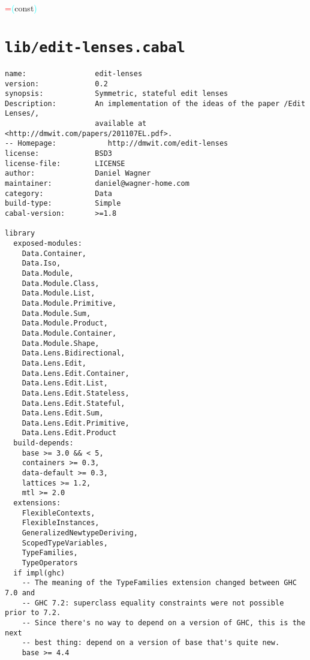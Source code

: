 \hsspace \hsspace \hsspace \hsspace \hsspace \hsspace \hsspace \hsspace \hsspace \hsspace \hsspace \textcolor{red}{=}\hsspace \textcolor{cyan}{(}{\rm{}const}\textcolor{cyan}{)}\\
\section{\texttt{lib/edit-lenses.cabal}}
\begin{verbatim}
name:                edit-lenses
version:             0.2
synopsis:            Symmetric, stateful edit lenses
Description:         An implementation of the ideas of the paper /Edit Lenses/,
                     available at <http://dmwit.com/papers/201107EL.pdf>.
-- Homepage:            http://dmwit.com/edit-lenses
license:             BSD3
license-file:        LICENSE
author:              Daniel Wagner
maintainer:          daniel@wagner-home.com
category:            Data
build-type:          Simple
cabal-version:       >=1.8

library
  exposed-modules:
    Data.Container,
    Data.Iso,
    Data.Module,
    Data.Module.Class,
    Data.Module.List,
    Data.Module.Primitive,
    Data.Module.Sum,
    Data.Module.Product,
    Data.Module.Container,
    Data.Module.Shape,
    Data.Lens.Bidirectional,
    Data.Lens.Edit,
    Data.Lens.Edit.Container,
    Data.Lens.Edit.List,
    Data.Lens.Edit.Stateless,
    Data.Lens.Edit.Stateful,
    Data.Lens.Edit.Sum,
    Data.Lens.Edit.Primitive,
    Data.Lens.Edit.Product
  build-depends:
    base >= 3.0 && < 5,
    containers >= 0.3,
    data-default >= 0.3,
    lattices >= 1.2,
    mtl >= 2.0
  extensions:
    FlexibleContexts,
    FlexibleInstances,
    GeneralizedNewtypeDeriving,
    ScopedTypeVariables,
    TypeFamilies,
    TypeOperators
  if impl(ghc)
    -- The meaning of the TypeFamilies extension changed between GHC 7.0 and
    -- GHC 7.2: superclass equality constraints were not possible prior to 7.2.
    -- Since there's no way to depend on a version of GHC, this is the next
    -- best thing: depend on a version of base that's quite new.
    base >= 4.4

\end{verbatim}

